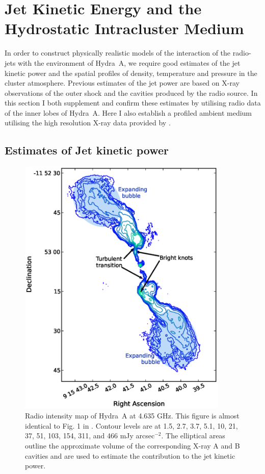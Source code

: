 \chapter{Jet Kinetic Energy and the Hydrostatic Intracluster Medium}\label{chapter3}

In order to construct physically realistic models of the interaction of the radio-jets with the environment of Hydra~A, we require good estimates of the jet kinetic power and the spatial profiles of density, temperature and pressure in the cluster atmosphere. Previous estimates of the jet power \citep{nulsen05,wise07} are based on X-ray observations of the outer shock and the cavities produced by the radio source. In this section I both supplement and confirm these estimates by utilising radio data of the inner lobes of Hydra~A. Here I also establish a profiled ambient medium utilising the high resolution X-ray data provided by \citet{david01}.
 

\section{Estimates of Jet kinetic power} \label{jet_kinetic_power}


\begin{figure}
\centering
\includegraphics[width=10cm]{taylor.eps}
\caption{ Radio intensity map of Hydra~A at 4.635 GHz. This figure is almost identical to Fig. 1 in \citet{taylor90}. Contour levels are at 1.5, 2.7, 3.7, 5.1, 10, 21, 37, 51, 103, 154, 311, and 466 mJy arcsec$^{-2}$. 
The elliptical areas outline the approximate volume of the corresponding X-ray A and B cavities and are used to estimate the contribution to the jet kinetic power. }
\label{taylor}
\end{figure}

